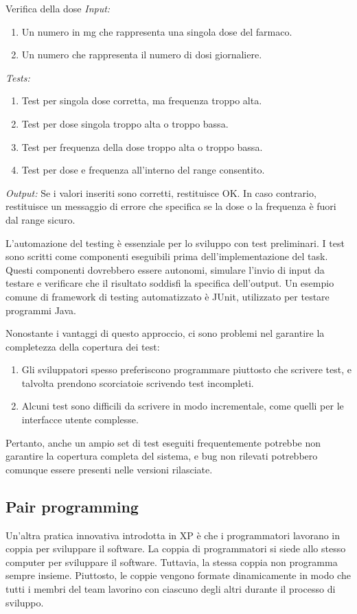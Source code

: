 \begin{Example}{Verifica della dose}{}
\textit{Input:}
\begin{enumerate}
    \item Un numero in mg che rappresenta una singola dose del farmaco.
    \item Un numero che rappresenta il numero di dosi giornaliere.
\end{enumerate}
\textit{Tests:}
\begin{enumerate}
    \item Test per singola dose corretta, ma frequenza troppo alta.
    \item Test per dose singola troppo alta o troppo bassa.
    \item Test per frequenza della dose troppo alta o troppo bassa.
    \item Test per dose e frequenza all'interno del range consentito.
\end{enumerate}
\textit{Output:} Se i valori inseriti sono corretti, restituisce OK. In caso contrario, restituisce un messaggio di errore che specifica se la dose o la frequenza è fuori dal range sicuro.
\end{Example} 

L’automazione del testing è essenziale per lo sviluppo con test preliminari. I test sono scritti come componenti eseguibili prima dell'implementazione del task. Questi componenti dovrebbero essere autonomi, simulare l'invio di input da testare e verificare che il risultato soddisfi la specifica dell'output. Un esempio comune di framework di testing automatizzato è JUnit, utilizzato per testare programmi Java.

Nonostante i vantaggi di questo approccio, ci sono problemi nel garantire la completezza della copertura dei test:
\begin{enumerate}
    \item Gli sviluppatori spesso preferiscono programmare piuttosto che scrivere test, e talvolta prendono scorciatoie scrivendo test incompleti.
    \item Alcuni test sono difficili da scrivere in modo incrementale, come quelli per le interfacce utente complesse.
\end{enumerate}
Pertanto, anche un ampio set di test eseguiti frequentemente potrebbe non garantire la copertura completa del sistema, e bug non rilevati potrebbero comunque essere presenti nelle versioni rilasciate.

\subsection{Pair programming}
Un'altra pratica innovativa introdotta in XP è che i programmatori lavorano in coppia per sviluppare il software. La coppia di programmatori si siede allo stesso computer per sviluppare il software. Tuttavia, la stessa coppia non programma sempre insieme. Piuttosto, le coppie vengono formate dinamicamente in modo che tutti i membri del team lavorino con ciascuno degli altri durante il processo di sviluppo.

